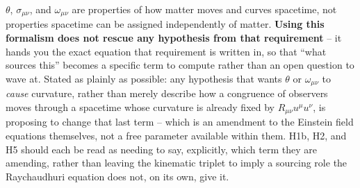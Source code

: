 \documentclass[12pt, a4paper]{article}
\begin{document}
$\theta$, $\sigma_{\mu\nu}$, and $\omega_{\mu\nu}$ are properties of
how matter moves and curves spacetime, not properties spacetime can
be assigned independently of matter. \textbf{Using this formalism
does not rescue any hypothesis from that requirement} -- it hands you
the exact equation that requirement is written in, so that ``what
sources this'' becomes a specific term to compute rather than an open
question to wave at. Stated as plainly as possible: any hypothesis
that wants $\theta$ or $\omega_{\mu\nu}$ to \emph{cause} curvature,
rather than merely describe how a congruence of observers moves
through a spacetime whose curvature is already fixed by
$R_{\mu\nu}u^\mu u^\nu$, is proposing to change that last term --
which is an amendment to the Einstein field equations themselves, not
a free parameter available within them. H1b, H2, and H5 should each
be read as needing to say, explicitly, which term they are amending,
rather than leaving the kinematic triplet to imply a sourcing role
the Raychaudhuri equation does not, on its own, give it.
\end{document}
